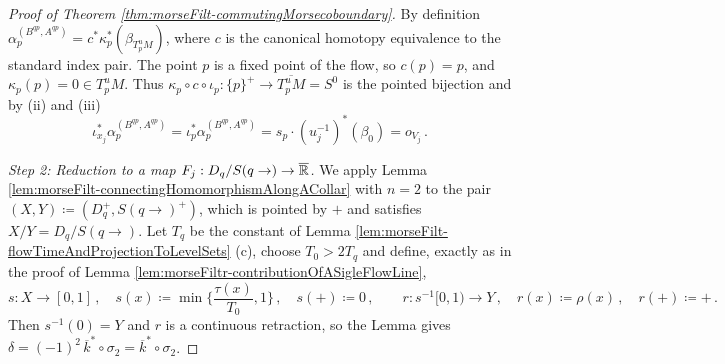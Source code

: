 \begin{proof}[Proof of Theorem \ref{thm:morseFilt-commutingMorsecoboundary}]
By definition $\alpha_p^{(B^{qp},A^{qp})}=c^*\kappa_p^*(\beta_{T^u_pM})$, where $c$ is the canonical homotopy equivalence to the standard index pair. The point $p$ is a fixed point of the flow, so $c(p)=p$, and $\kappa_p(p)=0\in T^u_pM$. Thus $\kappa_p\circ c\circ \iota_p:\{p\}^+\to \overline{T^u_pM}=S^0$ is the pointed bijection and by (ii) and (iii)
\begin{equation*}
	\iota_{x_j}^*\alpha_p^{(B^{qp},A^{qp})}=\iota_{p}^*\alpha_p^{(B^{qp},A^{qp})}=s_p\cdot (u_j^{-1})^*(\beta_0)=o_{V_j}\,.
\end{equation*}
 
\emph{Step 2: Reduction to a map $F_j:D_q/S(q\to)\to\overline{\mathbb{R}}$.}
We apply Lemma \ref{lem:morseFilt-connectingHomomorphismAlongACollar} with $n=2$ to the pair $(X,Y)\coloneq(D_q^+,S(q\to)^+)$, which is pointed by $+$ and satisfies $X/Y=D_q/S(q\to)$. Let $T_q$ be the constant of Lemma \ref{lem:morseFilt-flowTimeAndProjectionToLevelSets} (c), choose $T_0>2T_q$ and define, exactly as in the proof of Lemma \ref{lem:morseFiltr-contributionOfASigleFlowLine},
\begin{equation*}
	s:X\to[0,1]\,,\quad s(x)\coloneq\min\Big\{\frac{\tau(x)}{T_0},1\Big\}\,,\quad s(+)\coloneq 0\,,
	\qquad
	r:s^{-1}[0,1)\to Y\,,\quad r(x)\coloneq \rho(x)\,,\quad r(+)\coloneq +\,.
\end{equation*}
Then $s^{-1}(0)=Y$ and $r$ is a continuous retraction, so the Lemma gives $\delta=(-1)^2\,\overline{k}^*\circ\sigma_2=\overline{k}^*\circ\sigma_2$.
 

\end{proof}
